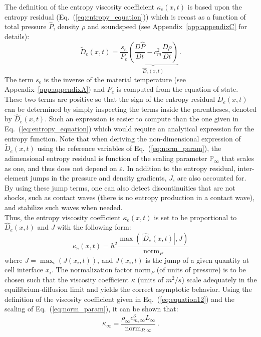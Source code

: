 \documentclass[review]{elsarticle}
\newcommand{\eqt}[1]{Eq.~(\ref{#1})}                     %
\newcommand{\app}[1]{Appendix~\ref{#1}}                     %
\newcommand{\norm}{\textrm{norm}}
\renewcommand{\Re}{\textrm{Re}}
\renewcommand{\Re}{\mathbb{P}_\infty}
\begin{document}
The definition of the entropy viscosity coefficient $\kappa_e(x,t)$ is based upon the entropy residual (\eqt{eq:entropy_equation}) which is recast as a function of total pressure $\hat{P}$, density $\rho$ and soundspeed (see \app{app:appendixC} for details):
\begin{equation}
\label{eq:equation9}
\tilde{D}_e(x,t) = \frac{s_e}{P_e} \underbrace{ \left( \frac{D\hat{P}}{Dt} - c_m^2 \frac{D\rho}{Dt} \right)}_\textrm{$\hat{D}_e(x,t)$} \,.
\end{equation}
The term $s_e$ is the inverse of the material temperature (see \app{app:appendixA}) and $P_e$ is computed from the equation of state. These two terms are positive so that the sign of the entropy residual $\tilde{D}_e(x,t)$ can be determined by simply inspecting the terms inside the parentheses, denoted by $\hat{D}_e(x,t)$. Such an expression is easier to compute than the one given in \eqt{eq:entropy_equation} which would require an analytical expression for the entropy function. Note that when deriving the non-dimensional expression of $\tilde{D}_e(x,t)$ using the reference variables of \eqt{eq:norm_param}, the adimensional entropy residual is function of the scaling parameter $\Re$ that scales as one, and thus does not depend on $\varepsilon$. In addition to the entropy residual, inter-element jumps in the pressure and density gradients, $J$, are also accounted for. By using these jump terms, one can also detect discontinuities that are not shocks, such as contact waves (there is no entropy production in a contact wave), and stabilize such waves when needed. \\
Thus, the entropy viscosity coefficient $\kappa_e(x,t)$ is set to be proportional to $\hat{D}_e(x,t)$ and $J$ with the following form: 
\begin{equation}
\label{eq:equation12}
\kappa_e(x,t) = h^2 \frac{\max (|\hat{D}_e(x,t)|, J)}{\norm_P}
\end{equation} 
where $J = \max_i (J(x_i,t))$, and $J(x_i,t)$ is the jump of a given quantity at cell interface $x_i$. The normalization factor $\norm_P$ (of units of pressure) is to be chosen such that the viscosity coefficient $\kappa$ (units of $m^2/s$) scale adequately in the equilibrium-diffusion limit and yields the correct asymptotic behavior. Using the definition of the viscosity coefficient given in \eqt{eq:equation12} and the scaling of \eqt{eq:norm_param}, it can be shown that:
%
\begin{equation}\label{eq:kappa_infty}
\kappa_\infty = \frac{\rho_\infty c^3_{m,\infty}  L_\infty}{\norm_{P,\infty}} \ .
\end{equation}
\end{document}
